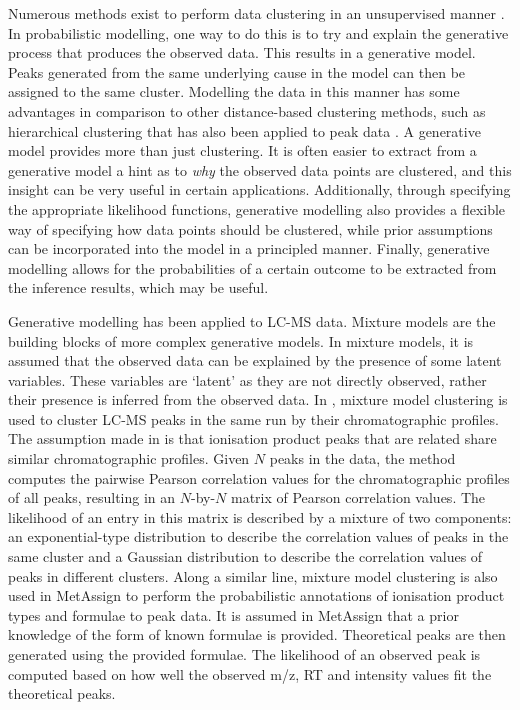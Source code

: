 Numerous methods exist to perform data clustering in an unsupervised manner \cite{xu2005survey}. In probabilistic modelling, one way to do this is to try and explain the generative process that produces the observed data. This results in a generative model. Peaks generated from the same underlying cause in the model can then be assigned to the same cluster. Modelling the data in this manner has some advantages in comparison to other distance-based clustering methods, such as hierarchical clustering that has also been applied to peak data \cite{DeSouza2006, Frank2007}. A generative model provides more than just clustering. It is often easier to extract from a generative model a hint as to \emph{why} the observed data points are clustered, and this insight can be very useful in certain applications. Additionally, through specifying the appropriate likelihood functions, generative modelling also provides a flexible way of specifying how data points should be clustered, while prior assumptions can be incorporated into the model in a principled manner. Finally, generative modelling allows for the probabilities of a certain outcome to be extracted from the inference results, which may be useful. 

Generative modelling has been applied to LC-MS data. Mixture models are the building blocks of more complex generative models. In mixture models, it is assumed that the observed data can be explained by the presence of some latent variables. These variables are `latent' as they are not directly observed, rather their presence is inferred from the observed data. In \cite{Rogers2012}, mixture model clustering is used to cluster LC-MS peaks in the same run by their chromatographic profiles. The assumption made in \cite{Rogers2012} is that ionisation product peaks that are related share similar chromatographic profiles. Given $N$ peaks in the data, the method computes the pairwise Pearson correlation values for the chromatographic profiles of all peaks, resulting in an $N$-by-$N$ matrix of Pearson correlation values. The likelihood of an entry in this matrix is described by a mixture of two components: an exponential-type distribution to describe the correlation values of peaks in the same cluster and a Gaussian distribution to describe the correlation values of peaks in different clusters. Along a similar line, mixture model clustering is also used in MetAssign \cite{Daly2014} to perform the probabilistic annotations of ionisation product types and formulae to peak data. It is assumed in MetAssign that a prior knowledge of the form of known formulae is provided. Theoretical peaks are then generated using the provided formulae. The likelihood of an observed peak is computed based on how well the observed m/z, RT and intensity values fit the theoretical peaks. 

